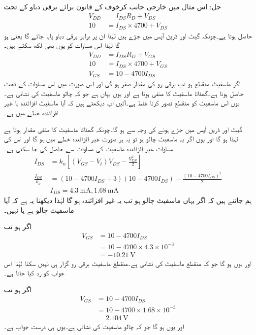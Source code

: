 حل:	اس مثال میں خارجی جانب کرخوف کے قانون برائے برقی دباو کے تحت
\begin{align*}
V_{DD}&=I_{DS}R_D+V_{DS}\\
10&=I_{DS}\times 4700+V_{DS}
\end{align*}
حاصل ہوتا ہے۔چونکہ گیٹ اور ڈرین آپس میں جڑے ہیں لہٰذا ان پر برابر برقی دباو پایا جائے گا یعنی   ہو گا لہٰذا اس مساوات کو یوں بھی لکھ سکتے ہیں۔
\begin{align*}
V_{DD}&=I_{DS}R_D+V_{GS}\\
10&=I_{DS} \times 4700+V_{GS}\\
V_{GS}&=10-4700 I_{DS}
\end{align*}
اگر ماسفیٹ منقطع ہو تب برقی رو کی مقدار صفر ہو گی اور اس صورت میں اس مساوات کے تحت   حاصل ہوتا ہے۔گھٹاتا ماسفیٹ کا    منفی ہوتا ہے اور یوں یہاں  ہے جو کہ چالو ماسفیٹ کی نشانی ہے۔یوں اس ماسفیٹ کو منقطع تصور کرنا غلط ہے۔آئیں اب دیکھتے ہیں کہ آیا ماسفیٹ افزائندہ یا غیر افزائندہ خطے میں ہے۔

گیٹ اور ڈرین آپس میں جڑے ہونے کی وجہ سے  ہو گا۔چونکہ گھٹاتا ماسفیٹ کا  منفی مقدار ہوتا ہے لہٰذا   ہو گا اور یوں اگر یہ ماسفیٹ چالو  ہو تو یہ ہر صورت  غیر افزائندہ خطے میں ہو گا اور اس کی مساوات غیر افزائندہ ماسفیٹ کی مساوات سے حاصل کی جا سکتی ہے۔
\begin{align*}
I_{DS}&=k_n \left[\left(V_{GS}-V_t \right )V_{DS}-\frac{V_{DS}^2}{2}\right]\\
\frac{I_{DS}}{k_n}&=\left(10-4700 I_{DS}+3 \right )(10-4700I_{DS})-\frac{(10-4700I_{DS})^2}{2}\\
& I_{DS}=\SI{4.3}{\milli \ampere} , \SI{1.68}{\milli \ampere}
\end{align*}
ہم جانتے ہیں کہ اگر یہاں ماسفیٹ چالو ہو تب یہ غیر افزائندہ ہو گا لہٰذا دیکھنا یہ ہے کہ آیا ماسفیٹ چالو ہے یا نہیں۔

اگر  ہو تب 	
\begin{align*}
V_{GS}&=10-4700 I_{DS}\\
&=10-4700 \times 4.3 \times 10^{-3}\\
&=\SI{-10.21}{\volt}
\end{align*}
اور یوں  ہو گا جو کہ منقطع ماسفیٹ کی نشانی ہے۔منقطع ماسفیٹ برقی رو گزار ہی نہیں سکتا لہٰذا اس جواب کو رد کیا جاتا ہے۔

اگر  ہو تب 	
\begin{align*}
V_{GS}&=10-4700 I_{DS}\\
&=10-4700 \times 1.68 \times 10^{-3}\\
&=\SI{2.104}{\volt}
\end{align*}
اور یوں  ہو گا جو کہ چالو ماسفیٹ کی نشانی ہے۔یوں  ہی درست جواب ہے۔

